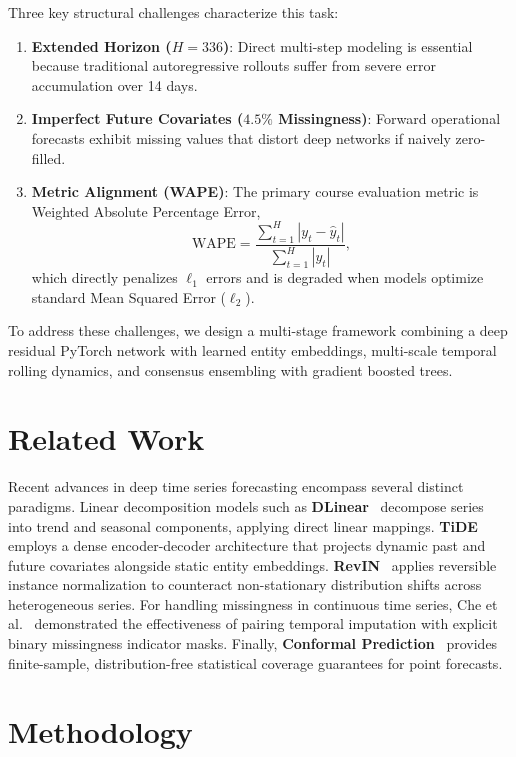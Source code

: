 \documentclass[11pt,a4paper]{article}
\begin{document}
Three key structural challenges characterize this task:
\begin{enumerate}
    \item \textbf{Extended Horizon ($H = 336$)}: Direct multi-step modeling is essential because traditional autoregressive rollouts suffer from severe error accumulation over 14 days.
    \item \textbf{Imperfect Future Covariates ($4.5\%$ Missingness)}: Forward operational forecasts exhibit missing values that distort deep networks if naively zero-filled.
    \item \textbf{Metric Alignment (WAPE)}: The primary course evaluation metric is Weighted Absolute Percentage Error,
    \begin{equation}
        \text{WAPE} = \frac{\sum_{t=1}^H |y_t - \hat{y}_t|}{\sum_{t=1}^H |y_t|},
    \end{equation}
    which directly penalizes $\ell_1$ errors and is degraded when models optimize standard Mean Squared Error ($\ell_2$).
\end{enumerate}

To address these challenges, we design a multi-stage framework combining a deep residual PyTorch network with learned entity embeddings, multi-scale temporal rolling dynamics, and consensus ensembling with gradient boosted trees.

\section{Related Work}
Recent advances in deep time series forecasting encompass several distinct paradigms. Linear decomposition models such as \textbf{DLinear}~\cite{zeng2023dlinear} decompose series into trend and seasonal components, applying direct linear mappings. \textbf{TiDE}~\cite{das2023tide} employs a dense encoder-decoder architecture that projects dynamic past and future covariates alongside static entity embeddings. \textbf{RevIN}~\cite{kim2022revin} applies reversible instance normalization to counteract non-stationary distribution shifts across heterogeneous series. For handling missingness in continuous time series, Che et al.~\cite{che2018missing} demonstrated the effectiveness of pairing temporal imputation with explicit binary missingness indicator masks. Finally, \textbf{Conformal Prediction}~\cite{angelopoulos2021conformal} provides finite-sample, distribution-free statistical coverage guarantees for point forecasts.

\section{Methodology}
\end{document}
